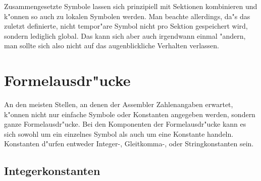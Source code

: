 \documentclass[12pt,a4paper,twoside]{report}
\begin{document}
Zusammengesetzte Symbole lassen sich prinzipiell mit Sektionen kombinieren
und k"onnen so auch zu lokalen Symbolen werden.  Man beachte allerdings,
da"s das zuletzt definierte, nicht tempor"are Symbol nicht pro Sektion
gespeichert wird, sondern lediglich global.  Das kann sich
aber auch irgendwann einmal "andern, man sollte sich also nicht auf das
augenblickliche Verhalten verlassen.


\section{Formelausdr"ucke}

An den meisten Stellen, an denen der Assembler Zahlenangaben erwartet,
k"onnen nicht nur einfache Symbole oder Konstanten angegeben werden,
sondern ganze Formelausdr"ucke.  Bei den Komponenten der Formelausdr"ucke
kann es sich sowohl um ein einzelnes Symbol als auch um eine Konstante
handeln.  Konstanten d"urfen entweder Integer-, Gleitkomma-, oder
Stringkonstanten sein.

\subsection{Integerkonstanten}
\label{SectIntConsts}
\end{document}
